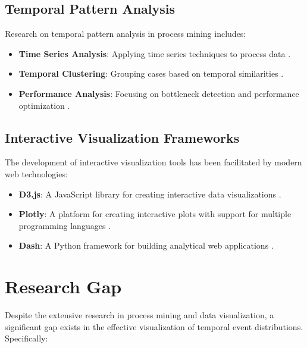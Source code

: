 \subsection{Temporal Pattern Analysis}
\label{subsec:temporal_patterns}

Research on temporal pattern analysis in process mining includes:

\begin{itemize}
    \item \textbf{Time Series Analysis}: Applying time series techniques to process data \cite{rogge2013time}.
    \item \textbf{Temporal Clustering}: Grouping cases based on temporal similarities \cite{bolt2018clustering}.
    \item \textbf{Performance Analysis}: Focusing on bottleneck detection and performance optimization \cite{vanderaalst2019performance}.
\end{itemize}

\subsection{Interactive Visualization Frameworks}
\label{subsec:interactive_frameworks}

The development of interactive visualization tools has been facilitated by modern web technologies:

\begin{itemize}
    \item \textbf{D3.js}: A JavaScript library for creating interactive data visualizations \cite{bostock2011d3}.
    \item \textbf{Plotly}: A platform for creating interactive plots with support for multiple programming languages \cite{plotly2015}.
    \item \textbf{Dash}: A Python framework for building analytical web applications \cite{plotly2017dash}.
\end{itemize}

\section{Research Gap}
\label{sec:research_gap}

Despite the extensive research in process mining and data visualization, a significant gap exists in the effective visualization of temporal event distributions. Specifically:

